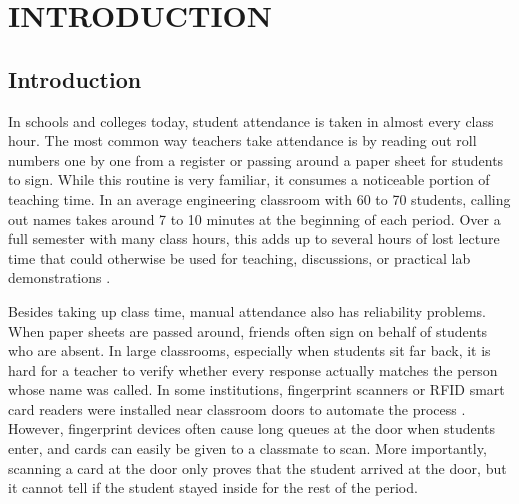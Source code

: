 \documentclass[10pt]{report}
\begin{document}
\newpage
\renewcommand*\contentsname{TABLE OF CONTENTS}
\tableofcontents
{}
\thispagestyle{empty}

\chapter{INTRODUCTION}
\linespread{1.5}

\section{Introduction}
\hspace{0.5cm}In schools and colleges today, student attendance is taken in almost every class hour. The most common way teachers take attendance is by reading out roll numbers one by one from a register or passing around a paper sheet for students to sign. While this routine is very familiar, it consumes a noticeable portion of teaching time. In an average engineering classroom with 60 to 70 students, calling out names takes around 7 to 10 minutes at the beginning of each period. Over a full semester with many class hours, this adds up to several hours of lost lecture time that could otherwise be used for teaching, discussions, or practical lab demonstrations \cite{raj2024facial}.

\hspace{0.5cm}Besides taking up class time, manual attendance also has reliability problems. When paper sheets are passed around, friends often sign on behalf of students who are absent. In large classrooms, especially when students sit far back, it is hard for a teacher to verify whether every response actually matches the person whose name was called. In some institutions, fingerprint scanners or RFID smart card readers were installed near classroom doors to automate the process \cite{rajesh2023smart}. However, fingerprint devices often cause long queues at the door when students enter, and cards can easily be given to a classmate to scan. More importantly, scanning a card at the door only proves that the student arrived at the door, but it cannot tell if the student stayed inside for the rest of the period.
\end{document}
